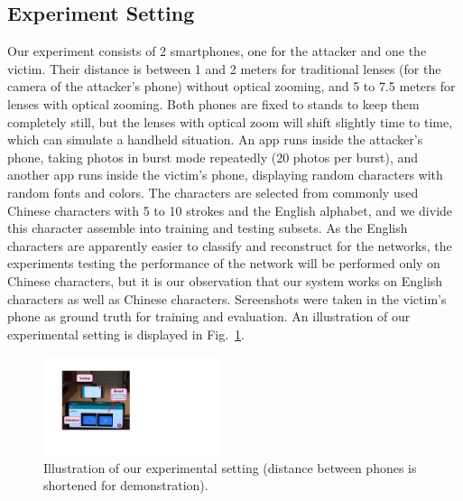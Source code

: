 \subsection{Experiment Setting}
\label{sec-experiment-setting}
Our experiment consists of 2 smartphones, one for the attacker and one the victim. Their distance is between 1 and 2 meters for traditional lenses (for the camera of the attacker's phone) without optical zooming, and 5 to 7.5 meters for lenses with optical zooming. Both phones are fixed to stands to keep them completely still, but the lenses with optical zoom will shift slightly time to time, which can simulate a handheld situation. An app runs inside the attacker's phone, taking photos in burst mode repeatedly (20 photos per burst), and another app runs inside the victim's phone, displaying random characters with random fonts and colors. The characters are selected from commonly used Chinese characters with 5 to 10 strokes and the English alphabet, and we divide this character assemble into training and testing subsets. As the English characters are apparently easier to classify and reconstruct for the networks, the experiments testing the performance of the network will be performed only on Chinese characters, but it is our observation that our system works on English characters as well as Chinese characters. Screenshots were taken in the victim's phone as ground truth for training and evaluation. An illustration of our experimental setting is displayed in Fig.~\ref{illustration_of_system}.
\begin{figure}
	\centering
	\includegraphics[width=0.46\textwidth]{pic/setup.pdf}
    \caption{Illustration of our experimental setting (distance between phones is shortened for demonstration).}
	\label{illustration_of_system}
\end{figure}

